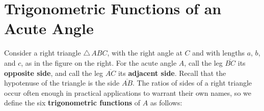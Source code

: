 \section{Trigonometric Functions of an Acute Angle}
Consider a right triangle $\triangle\,ABC$, with the right angle at $C$ and with lengths $a$, $b$,
and $c$, as in the figure on the right. For the acute angle $A$, call the leg $\overline{BC}$ its
\textbf{opposite side}, and call the leg $\overline{AC}$ its \textbf{adjacent side}. Recall
that the hypotenuse of the triangle is the side $\overline{AB}$. The ratios of sides of a right
triangle occur often enough in practical applications to warrant their own names, so we define the
six \textbf{trigonometric functions} of $A$ as follows:

